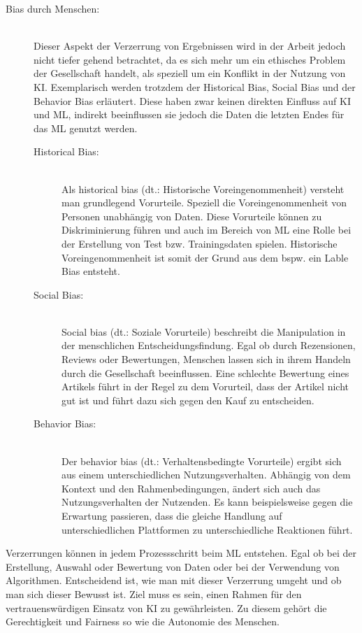 \begin{onehalfspace}
\begin{description}
            \item [Bias durch Menschen:] \hfill \\
            Dieser Aspekt der Verzerrung von Ergebnissen wird in der Arbeit jedoch nicht tiefer gehend betrachtet, da es sich mehr um ein ethisches Problem der Gesellschaft handelt, als speziell um ein Konflikt in der Nutzung von \ac{KI}. Exemplarisch werden trotzdem der Historical Bias, Social Bias und der Behavior Bias erläutert. Diese haben zwar keinen direkten Einfluss auf \ac*{KI} und \ac*{ML}, indirekt beeinflussen sie jedoch die Daten die letzten Endes für das \ac*{ML} genutzt werden.
            \begin{description}
                \item [Historical Bias:] \hfill \\
                Als \glqq{}historical bias\grqq{} (\ac*{dt}.: Historische Voreingenommenheit) versteht man grundlegend Vorurteile. Speziell die Voreingenommenheit von Personen unabhängig von Daten. Diese Vorurteile können zu Diskriminierung führen und auch im Bereich von \ac*{ML} eine Rolle bei der Erstellung von Test bzw. Trainingsdaten spielen. Historische Voreingenommenheit ist somit der Grund aus dem bspw. ein Lable Bias entsteht.\cite{Mehrabi2021}\cite{Parkavi2018}
                \item [Social Bias:] \hfill \\
                \glqq{}Social bias\grqq{} (\ac*{dt}.: Soziale Vorurteile) beschreibt die Manipulation in der menschlichen Entscheidungsfindung. Egal ob durch Rezensionen, Reviews oder Bewertungen, Menschen lassen sich in ihrem Handeln durch die Gesellschaft beeinflussen. Eine schlechte Bewertung eines Artikels führt in der Regel zu dem Vorurteil, dass der Artikel nicht gut ist und führt dazu sich gegen den Kauf zu entscheiden.\cite{Mehrabi2021}\cite{Parkavi2018}
                \item [Behavior Bias:] \hfill \\
                Der \glqq{}behavior bias\grqq{} (\ac*{dt}.: Verhaltensbedingte Vorurteile) ergibt sich aus einem unterschiedlichen Nutzungsverhalten. Abhängig von dem Kontext und den Rahmenbedingungen, ändert sich auch das Nutzungsverhalten der Nutzenden. Es kann beispielsweise gegen die Erwartung passieren, dass die gleiche Handlung auf unterschiedlichen Plattformen zu unterschiedliche Reaktionen führt.\cite{Mehrabi2021}
            \end{description}
        \end{description}
        Verzerrungen können in jedem Prozessschritt beim \ac*{ML} entstehen. Egal ob bei der Erstellung, Auswahl oder Bewertung von Daten oder bei der Verwendung von Algorithmen. Entscheidend ist, wie man mit dieser Verzerrung umgeht und ob man sich dieser Bewusst ist. Ziel muss es sein, einen Rahmen für den vertrauenswürdigen Einsatz von \ac*{KI} zu gewährleisten. Zu diesem gehört die Gerechtigkeit und Fairness so wie die Autonomie des Menschen. 

\end{onehalfspace}
